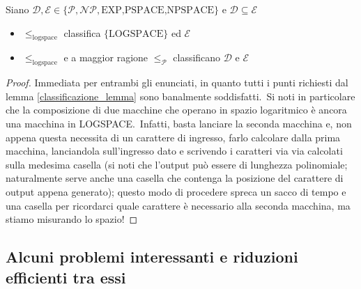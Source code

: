 \begin{theorem}
    \label{class_logspace}
    Siano $\mathcal{D}, \mathcal{E} \in \{\mathcal{P}, \mathcal{NP}, \mbox{EXP,PSPACE,NPSPACE}\}$ e $\mathcal{D} \subseteq \mathcal{E}$
    \begin{itemize}
        \itemsep0px
        \item $\leqslant_{\mathrm{logspace}}$ classifica $\{\mathrm{LOGSPACE}\}$ ed $\mathcal{E}$
        \item $\leqslant_{\mathrm{logspace}}$ e a maggior ragione $\leqslant_{\mathcal{P}}$ classificano $\mathcal{D}$ e $\mathcal{E}$
    \end{itemize}
\end{theorem}

\begin{proof}

    Immediata per entrambi gli enunciati, in quanto tutti i punti richiesti dal lemma \ref{classificazione_lemma} sono banalmente soddisfatti.\
    Si noti in particolare che la composizione di due macchine che operano in spazio logaritmico è ancora una macchina in LOGSPACE.\
    Infatti, basta lanciare la seconda macchina e, non appena questa necessita di un carattere di ingresso, farlo calcolare dalla prima macchina, lanciandola sull'ingresso dato e scrivendo i caratteri via via calcolati sulla medesima casella (si noti che l'output può essere di lunghezza polinomiale; naturalmente serve anche una casella che contenga la posizione del carattere di output appena generato); questo modo di procedere spreca un sacco di tempo e una casella per ricordarci quale carattere è necessario alla seconda macchina, ma stiamo misurando lo spazio!

\end{proof}

\subsection{Alcuni problemi interessanti e riduzioni efficienti tra essi}


